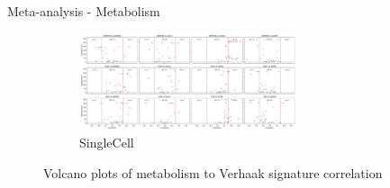 \documentclass[aspectratio=169,9pt]{beamer}
\begin{document}
    \begin{frame}{Meta-analysis - Metabolism}
        \begin{adjustwidth}{-5cm}{-5cm}
            \centering
            \begin{figure}\ContinuedFloat
                \centering
                \begin{subfigure}[c]{\textwidth}
                    \centering
                    \includegraphics[width=0.7\textwidth]{volcano_SC_Ver_Met}
                    \caption{SingleCell}
                \end{subfigure}
                \caption{Volcano plots of metabolism to Verhaak signature correlation}
            \end{figure}
        \end{adjustwidth}
    \end{frame}
\end{document}
